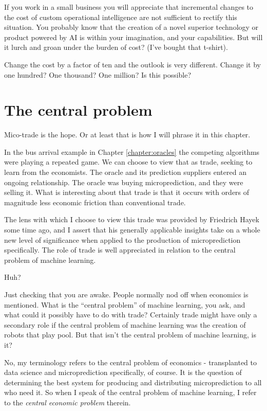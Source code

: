 If you work in a small business you will appreciate that incremental changes to the cost of custom operational intelligence are not sufficient to rectify this situation. You probably know that the creation of a novel superior technology or product powered by AI is within your imagination, and your capabilities. But will it lurch and groan under the burden of cost? (I've bought that t-shirt). 

Change the cost by a factor of ten and the outlook is very different. Change it by one hundred? One thousand? One million? Is this possible? 

\section{The central problem}

Mico-trade is the hope. Or at least that is how I will phrase it in this chapter. 

In the bus arrival example in Chapter \ref{chapter:oracles} the competing algorithms were playing a repeated game. We can choose to view that as trade, seeking to learn from the economists. The oracle and its prediction suppliers entered an ongoing relationship. The oracle was buying microprediction, and they were selling it. What is interesting about that trade is that it occurs with orders of magnitude less economic friction than conventional trade. 

The lens with which I choose to view this trade was provided by Friedrich Hayek some time ago, and I assert that his generally applicable insights take on a whole new level of significance when applied to the production of microprediction specifically. The role of trade is well appreciated in relation to the central problem of machine learning.

Huh? 

Just checking that you are awake. People normally nod off when economics is mentioned. What is the ``central problem'' of machine learning, you ask, and what could it possibly have to do with trade? Certainly trade might have only a secondary role if the central problem of machine learning was the creation of robots that play pool. But that isn't the central problem of machine learning, is it? 

No, my terminology refers to the central problem of economics - transplanted to data science and microprediction specifically, of course. It is the question of determining the best system for producing and distributing microprediction to all who need it. So when I speak of the central problem of machine learning, I refer to the {\em central economic problem} therein.

